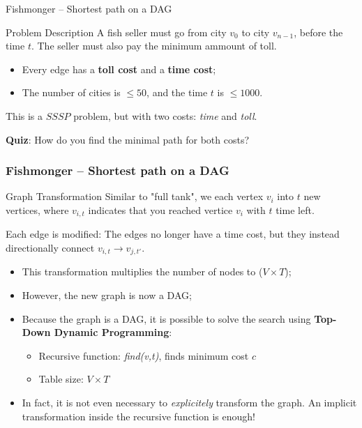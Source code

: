 \begin{frame}{Fishmonger -- Shortest path on a DAG}
  \begin{block}{Problem Description}
    A fish seller must go from city $v_0$ to city $v_{n-1}$, before the time $t$. The seller must also pay the minimum ammount of toll.\bigskip

    \begin{itemize}
      \item Every edge has a {\bf toll cost} and a {\bf time cost};
      \item The number of cities is $\leq 50$, and the time $t$ is $\leq 1000$.
    \end{itemize}
  \end{block}\bigskip

  This is a $SSSP$ problem, but with two costs: \emph{time} and \emph{toll}.\medskip

  {\bf Quiz}: How do you find the minimal path for both costs?
\end{frame}

\begin{frame}
  \frametitle{Fishmonger -- Shortest path on a DAG}

  \begin{block}{Graph Transformation}
    Similar to "full tank", we each vertex $v_i$ into $t$ new vertices, where $v_{i,t}$ indicates that you reached vertice $v_{i}$ with $t$ time left.\bigskip

    Each edge is modified: The edges no longer have a time cost, but they instead directionally connect $v_{i,t} \to v_{j,t'}$.
  \end{block}

  \begin{itemize}
    \item This transformation multiplies the number of nodes to ($V\times T$);
    \item However, the new graph is now a DAG;
    \item Because the graph is a DAG, it is possible to solve the search using {\bf Top-Down Dynamic Programming}:
    \begin{itemize}
      \item Recursive function: \emph{find(v,t)}, finds minimum cost $c$
      \item Table size: $V\times T$
    \end{itemize}
    \item In fact, it is not even necessary to \emph{explicitely} transform the graph. An implicit transformation inside the recursive function is enough!
  \end{itemize}
\end{frame}

